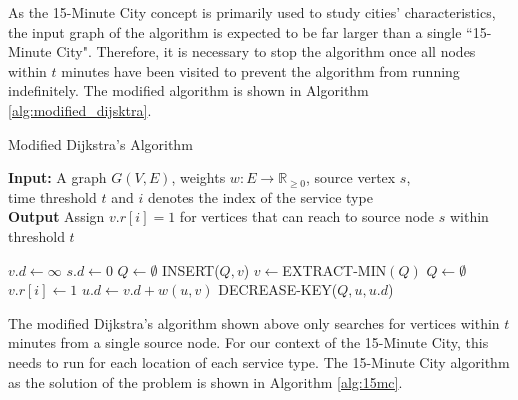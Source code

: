 As the 15-Minute City concept is primarily used to study cities' characteristics, the input graph of the algorithm is expected to be far larger than a single ``15-Minute City". Therefore, it is necessary to stop the algorithm once all nodes within $t$ minutes have been visited to prevent the algorithm from running indefinitely. The modified algorithm is shown in Algorithm \ref{alg:modified_dijsktra}.

\begin{algorithm}[H]
    \caption{Modified Dijkstra's Algorithm} \label{alg:modified_dijsktra}
    \textbf{Input:} A graph $G(V,E)$, weights $w:E\rightarrow\mathbb{R}_{\geq 0}$, source vertex $s$, \\  time threshold $t$ and $i$ denotes the index of the service type\\
    \textbf{Output} Assign $v.r[i]=1$ for vertices that can reach to source node $s$ within threshold $t$ %
    \begin{algorithmic}
            \State $v.d\gets\infty$
        \EndFor
        \State $s.d\gets 0$
        \State $Q\gets\emptyset$
            \State INSERT($Q,v$)
        \EndFor
            \State $v\gets$EXTRACT-MIN$(Q)$
                \State $Q\gets\emptyset$ 
            \Else
                \State $v.r[i] \gets 1 $
                        \State $u.d\gets v.d+w(u,v)$
                        \State DECREASE-KEY($Q,u,u.d$)
                    \EndIf
                \EndFor
            \EndIf
        \EndWhile
    \end{algorithmic}
\end{algorithm}

The modified Dijkstra's algorithm shown above only searches for vertices within $t$ minutes from a single source node. For our context of the 15-Minute City, this needs to run for each location of each service type. The 15-Minute City algorithm as the solution of the problem is shown in Algorithm \ref{alg:15mc}.

